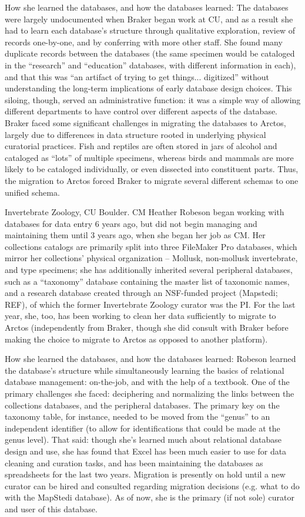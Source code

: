How she learned the databases, and how the databases learned: The databases were largely undocumented when Braker began work at CU, and as a result she had to learn each database’s structure through qualitative exploration, review of records one-by-one, and by conferring with more other staff.  She found many duplicate records between the databases (the same specimen would be cataloged in the “research” and “education” databases, with different information in each), and that this was “an artifact of trying to get things... digitized” without understanding the long-term implications of early database design choices.   This siloing, though, served an administrative function: it was a simple way of allowing different departments to have control over different aspects of the database.  Braker faced some significant challenges in migrating the databases to Arctos, largely due to differences in data structure rooted in underlying physical curatorial practices.  Fish and reptiles are often stored in jars of alcohol and cataloged as “lots” of multiple specimens, whereas birds and mammals are more likely to be cataloged individually, or even dissected into constituent parts.  Thus, the migration to Arctos forced Braker to migrate several different schemas to one unified schema.

Invertebrate Zoology, CU Boulder. CM Heather Robeson began working with databases for data entry 6 years ago, but did not begin managing and maintaining them until 3 years ago, when she began her job as CM.  Her collections catalogs are primarily split into three FileMaker Pro databases, which mirror her collections’ physical organization -- Mollusk, non-mollusk invertebrate, and type specimens; she has additionally inherited several peripheral databases, such as a “taxonomy” database containing the master list of taxonomic names, and a research database created through an NSF-funded project (Mapstedi; REF), of which the former Invertebrate Zoology curator was the PI.  For the last year, she, too, has been working to clean her data sufficiently to migrate to Arctos (independently from Braker, though she did consult with Braker before making the choice to migrate to Arctos as opposed to another platform). 

 How she learned the databases, and how the databases learned: Robeson learned the database’s structure while simultaneously learning the basics of relational database management: on-the-job, and with the help of a textbook. One of the primary challenges she faced: deciphering and normalizing the links between the collections databases, and the peripheral databases.  The primary key on the taxonomy table, for instance, needed to be moved from the “genus” to an independent identifier (to allow for identifications that could be made at the genus level).  That said: though she’s learned much about relational database design and use, she has found that Excel has been much easier to use for data cleaning and curation tasks, and has been maintaining the databases as spreadsheets for the last two years.  Migration is presently on hold until a new curator can be hired and consulted regarding migration decisions (e.g. what to do with the MapStedi database).  As of now, she is the primary (if not sole) curator and user of this database.

